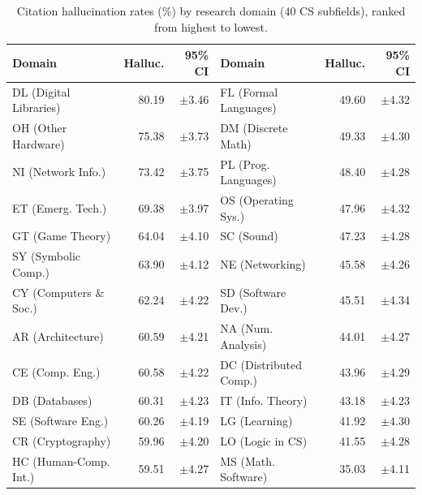 \begin{table}[t]
  \centering
  \begin{threeparttable}
    \caption{Citation hallucination rates (\%) by research domain (40 CS subfields), ranked from highest to lowest.}
    \label{tab:domain_sensitivity}
    \small
{}
\begin{tabular}{lrr@{\hskip 2em}lrr}
\toprule
\textbf{Domain} & \cellcolor{red!12}\textbf{Halluc.} & \textbf{95\% CI} & \textbf{Domain} & \cellcolor{red!12}\textbf{Halluc.} & \textbf{95\% CI} \\
\midrule
DL (Digital Libraries) & \cellcolor{red!28}80.19 & $\pm$3.46 & FL (Formal Languages) & \cellcolor{red!20}49.60 & $\pm$4.32 \\
OH (Other Hardware) & \cellcolor{red!28}75.38 & $\pm$3.73 & DM (Discrete Math) & \cellcolor{red!20}49.33 & $\pm$4.30 \\
NI (Network Info.) & \cellcolor{red!28}73.42 & $\pm$3.75 & PL (Prog. Languages) & \cellcolor{red!20}48.40 & $\pm$4.28 \\
ET (Emerg. Tech.) & \cellcolor{red!28}69.38 & $\pm$3.97 & OS (Operating Sys.) & \cellcolor{red!20}47.96 & $\pm$4.32 \\
GT (Game Theory) & \cellcolor{red!26}64.04 & $\pm$4.10 & SC (Sound) & \cellcolor{red!18}47.23 & $\pm$4.28 \\
SY (Symbolic Comp.) & \cellcolor{red!26}63.90 & $\pm$4.12 & NE (Networking) & \cellcolor{red!18}45.58 & $\pm$4.26 \\
CY (Computers \& Soc.) & \cellcolor{red!26}62.24 & $\pm$4.22 & SD (Software Dev.) & \cellcolor{red!18}45.51 & $\pm$4.34 \\
AR (Architecture) & \cellcolor{red!24}60.59 & $\pm$4.21 & NA (Num. Analysis) & \cellcolor{red!18}44.01 & $\pm$4.27 \\
CE (Comp. Eng.) & \cellcolor{red!24}60.58 & $\pm$4.22 & DC (Distributed Comp.) & \cellcolor{red!18}43.96 & $\pm$4.29 \\
DB (Databases) & \cellcolor{red!24}60.31 & $\pm$4.23 & IT (Info. Theory) & \cellcolor{red!18}43.18 & $\pm$4.23 \\
SE (Software Eng.) & \cellcolor{red!24}60.26 & $\pm$4.19 & LG (Learning) & \cellcolor{red!16}41.92 & $\pm$4.30 \\
CR (Cryptography) & \cellcolor{red!24}59.96 & $\pm$4.20 & LO (Logic in CS) & \cellcolor{red!16}41.55 & $\pm$4.28 \\
HC (Human-Comp. Int.) & \cellcolor{red!24}59.51 & $\pm$4.27 & MS (Math. Software) & \cellcolor{red!14}35.03 & $\pm$4.11 \\

\end{tabular}
\end{threeparttable}
\end{table}
